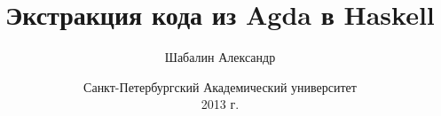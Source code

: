 \documentclass{beamer}
\title{Экстракция кода из Agda в Haskell}
\author{Шабалин Александр}
\institute{{\tiny научный руководитель}\\ \vspace{.10cm}доц. Москвин Д. Н.}
\date{\scriptsize Санкт-Петербургский Академический университет\\ \vspace{.10cm}2013 г.}
\begin{document}
\frame{\titlepage}


\end{document}
